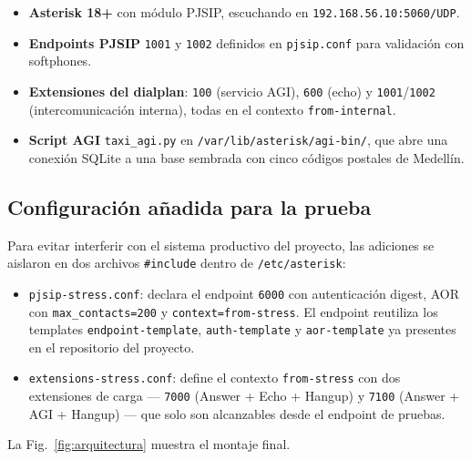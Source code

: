 \documentclass[conference]{IEEEtran}
\begin{document}
\begin{itemize}
    \item \textbf{Asterisk 18+} con m\'odulo PJSIP, escuchando en
    \texttt{192.168.56.10:5060/UDP}.
    \item \textbf{Endpoints PJSIP} \texttt{1001} y \texttt{1002}
    definidos en \texttt{pjsip.conf} para validaci\'on con softphones.
    \item \textbf{Extensiones del dialplan}: \texttt{100} (servicio
    AGI), \texttt{600} (echo) y \texttt{1001}/\texttt{1002}
    (intercomunicaci\'on interna), todas en el contexto
    \texttt{from-internal}.
    \item \textbf{Script AGI} \texttt{taxi\_agi.py} en
    \texttt{/var/lib/asterisk/agi-bin/}, que abre una conexi\'on
    SQLite a una base sembrada con cinco c\'odigos postales de
    Medell\'in.
\end{itemize}

\subsection{Configuraci\'on a\~nadida para la prueba}

Para evitar interferir con el sistema productivo del proyecto, las
adiciones se aislaron en dos archivos \texttt{\#include} dentro de
\texttt{/etc/asterisk}:

\begin{itemize}
    \item \texttt{pjsip-stress.conf}: declara el endpoint
    \texttt{6000} con autenticaci\'on digest, AOR con
    \texttt{max\_contacts=200} y \texttt{context=from-stress}. El
    endpoint reutiliza los templates \texttt{endpoint-template},
    \texttt{auth-template} y \texttt{aor-template} ya presentes en el
    repositorio del proyecto.
    \item \texttt{extensions-stress.conf}: define el contexto
    \texttt{from-stress} con dos extensiones de carga ---
    \texttt{7000} (Answer + Echo + Hangup) y \texttt{7100} (Answer +
    AGI + Hangup) --- que solo son alcanzables desde el endpoint de
    pruebas.
\end{itemize}

La Fig.~\ref{fig:arquitectura} muestra el montaje final.
\end{document}
